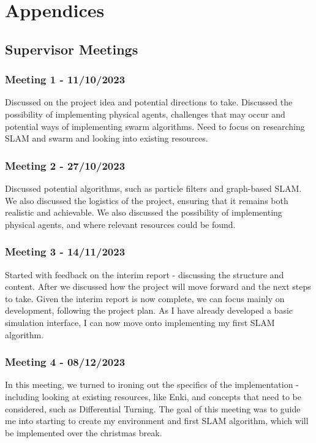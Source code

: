 \documentclass[12pt]{article}
\begin{document}
\newpage

\section{Appendices}

\subsection{Supervisor Meetings}    %

\subsubsection{Meeting 1 - 11/10/2023}
Discussed on the project idea and potential directions to take. Discussed the possibility of implementing physical agents,
challenges that may occur and potential ways of implementing swarm algorithms. Need to focus on researching SLAM and swarm
and looking into existing resources.
\subsubsection{Meeting 2 - 27/10/2023}
Discussed potential algorithms, such as particle filters and graph-based SLAM. We also discussed the logistics of the project,
ensuring that it remains both realistic and achievable. We also discussed the possibility of implementing physical agents,
and where relevant resources could be found.
\subsubsection{Meeting 3 - 14/11/2023}
Started with feedback on the interim report - discussing the structure and content. After we discussed how the project will
move forward and the next steps to take. Given the interim report is now complete, we can focus mainly on development, following
the project plan. As I have already developed a basic simulation interface, I can now move onto implementing my first SLAM algorithm.
\subsubsection{Meeting 4 - 08/12/2023}
In this meeting, we turned to ironing out the specifics of the implementation - including looking at existing resources, like
Enki, and concepts that need to be considered, such as Differential Turning. The goal of this meeting was to guide me into
starting to create my environment and first SLAM algorithm, which will be implemented over the christmas break.
\end{document}
